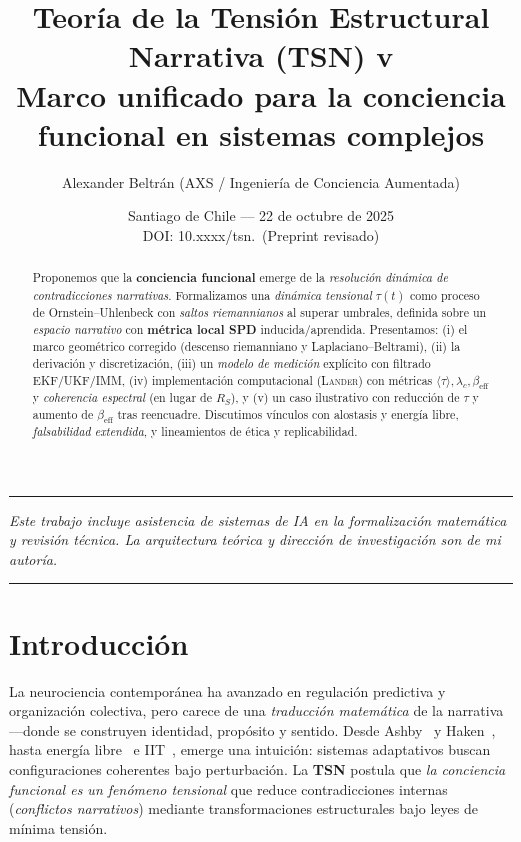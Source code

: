 \documentclass[10pt,a4paper,twocolumn]{article}
\title{\textbf{Teoría de la Tensión Estructural Narrativa (TSN) v\tsnversion}\\
\large Marco unificado para la conciencia funcional en sistemas complejos}
\author{\normalsize Alexander Beltrán (AXS / Ingeniería de Conciencia Aumentada)}
\date{\small Santiago de Chile — 22 de octubre de 2025 \\ DOI: 10.xxxx/tsn.\tsnversion\ (Preprint revisado)}
\newcommand{\AXSrule}{\par\noindent\color{AXSGray}\rule{\linewidth}{1.0pt}\par}
\theoremstyle{definition}
\theoremstyle{plain}
\begin{document}
\maketitle
\AXSrule

\begin{abstract}
\noindent
Proponemos que la \textbf{conciencia funcional} emerge de la \emph{resolución dinámica de contradicciones narrativas}. Formalizamos una \emph{dinámica tensional} \(\tau(t)\) como proceso de Ornstein--Uhlenbeck con \emph{saltos riemannianos} al superar umbrales, definida sobre un \emph{espacio narrativo} con \textbf{métrica local SPD} inducida/aprendida. Presentamos: (i) el marco geométrico corregido (descenso riemanniano y Laplaciano--Beltrami), (ii) la derivación y discretización, (iii) un \emph{modelo de medición} explícito con filtrado EKF/UKF/IMM, (iv) implementación computacional (\textsc{Lander}) con métricas \(\langle\tau\rangle,\lambda_c,\beta_{\mathrm{eff}}\) y \emph{coherencia espectral} (en lugar de \(R_S\)), y (v) un caso ilustrativo con reducción de \(\tau\) y aumento de \(\beta_{\mathrm{eff}}\) tras reencuadre. Discutimos vínculos con alostasis y energía libre, \emph{falsabilidad extendida}, y lineamientos de ética y replicabilidad. 
\end{abstract}

\begingroup\small\itshape
Este trabajo incluye asistencia de sistemas de IA en la formalización matemática y revisión técnica. La arquitectura teórica y dirección de investigación son de mi autoría.
\par\endgroup
\AXSrule

\section{Introducción}
La neurociencia contemporánea ha avanzado en regulación predictiva y organización colectiva, pero carece de una \emph{traducción matemática} de la narrativa—donde se construyen identidad, propósito y sentido. Desde Ashby~\cite{ashby1956} y Haken~\cite{haken1983,haken1983adv}, hasta energía libre~\cite{friston2010} e IIT~\cite{tononi2015}, emerge una intuición: sistemas adaptativos buscan configuraciones coherentes bajo perturbación. La \textbf{TSN} postula que \emph{la conciencia funcional es un fenómeno tensional} que reduce contradicciones internas (\emph{conflictos narrativos}) mediante transformaciones estructurales bajo leyes de mínima tensión.
\end{document}
